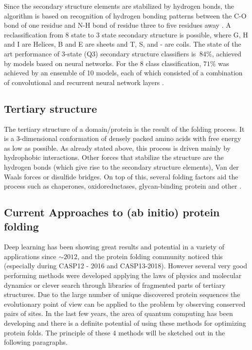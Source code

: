 Since the secondary structure elements are stabilized by hydrogen bonds, the algorithm is based on recognition of hydrogen bonding patterns between the C-O bond of one residue and N-H bond of residue three to five residues away \cite{dssp2}. 
A reclassification from 8 state to 3 state secondary structure is possible, where G, H and I are Helices, B and E are sheets and T, S, and - are coils. 
The state of the art performance of 3-state (Q3) secondary structure classifiers is $~84\%$, achieved by models based on neural networks. 
For the 8 class classification, $71\%$ was achieved by an ensemble of 10 models, each of which consisted of a combination of convolutional and recurrent neural network layers \cite{dssp_sec}. 

\subsection{Tertiary structure}

The tertiary structure of a domain/protein is the result of the folding process. 
It is a 3-dimensional conformation of densely packed amino acids with free energy as low as possible. 
As already stated above, this process is driven mainly by hydrophobic interactions. 
Other forces that stabilize the structure are the hydrogen bonds (which give rise to the secondary structure elements), Van der Waals forces or disulfide bridges. 
On top of this, several folding factors aid the process such as chaperones, oxidoreductases, glycan-binding protein and other \cite{principles_of_pf}.

\subsection{Current Approaches to (ab initio) protein folding}

Deep learning has been showing great results and potential in a variety of applications since $\sim2012$, and the protein folding community noticed this (especially during CASP12 - 2016 and CASP13-2018). 
However several very good performing methods were developed applying the laws of physics and molecular dynamics or clever search through libraries of fragmented parts of tertiary structures. 
Due to the large number of unique discovered protein sequences the evolutionary point of view can be applied to the problem by observing conserved pairs of sites. 
In the last few years, the area of quantum computing has been developing and there is a definite potential of using these methods for optimizing protein folds. 
The principle of these 4 methods will be sketched out in the following paragraphs.

